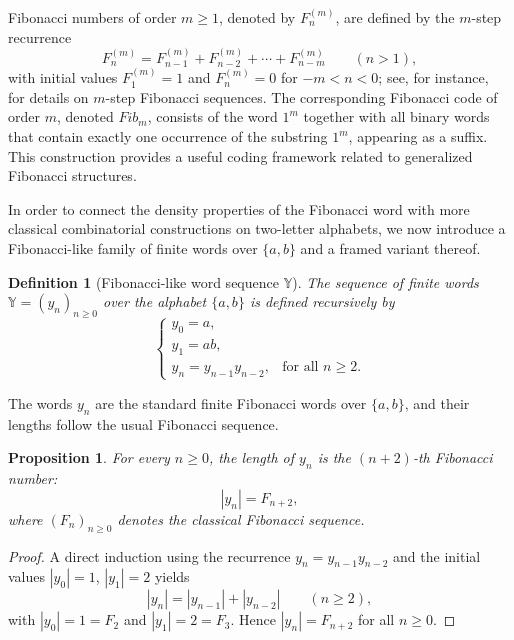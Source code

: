 \documentclass[12pt, a4paper]{article}
\newtheorem{proposition}{Proposition}[section]
\newtheorem{definition}{Definition}
\begin{document}
Fibonacci numbers of order $m \ge 1$, denoted by $F_n^{(m)}$, are defined by the $m$-step recurrence
\[
F_n^{(m)} = F_{n-1}^{(m)} + F_{n-2}^{(m)} + \cdots + F_{n-m}^{(m)} \qquad (n > 1),
\]
with initial values $F_1^{(m)} = 1$ and $F_n^{(m)} = 0$ for $-m < n < 0$; see, for instance,~\cite{Klein2010Nissan} for details on $m$-step Fibonacci sequences. The corresponding Fibonacci code of order $m$, denoted $Fib_m$, consists of the word $1^m$ together with all binary words that contain exactly one occurrence of the substring $1^m$, appearing as a suffix. This construction provides a useful coding framework related to generalized Fibonacci structures.

In order to connect the density properties of the Fibonacci word with more classical combinatorial constructions on two-letter alphabets, we now introduce a Fibonacci-like family of finite words over $\{a,b\}$ and a framed variant thereof.

\begin{definition}[Fibonacci-like word sequence $\mathbb{Y}$]\label{defnewwordn1}
The sequence of finite words $\mathbb{Y} = (y_n)_{n \ge 0}$ over the alphabet $\{a,b\}$ is defined recursively by
\begin{equation}\label{eq1defnewwordn1}
\begin{cases}
y_0 = a,\\
y_1 = ab,\\
y_n = y_{n-1} y_{n-2}, & \text{for all } n \ge 2.
\end{cases}
\end{equation}
\end{definition}

The words $y_n$ are the standard finite Fibonacci words over $\{a,b\}$, and their lengths follow the usual Fibonacci sequence.

\begin{proposition}\label{pro1defnewwordn1}
For every $n \ge 0$, the length of $y_n$ is the $(n+2)$-th Fibonacci number:
\[
|y_n| = F_{n+2},
\]
where $(F_n)_{n\ge 0}$ denotes the classical Fibonacci sequence.
\end{proposition}

\begin{proof}
A direct induction using the recurrence $y_n = y_{n-1}y_{n-2}$ and the initial values $|y_0| = 1$, $|y_1| = 2$ yields
\[
|y_n| = |y_{n-1}| + |y_{n-2}| \qquad (n \ge 2),
\]
with $|y_0| = 1 = F_2$ and $|y_1| = 2 = F_3$. Hence $|y_n| = F_{n+2}$ for all $n \ge 0$.
\end{proof}
\end{document}
